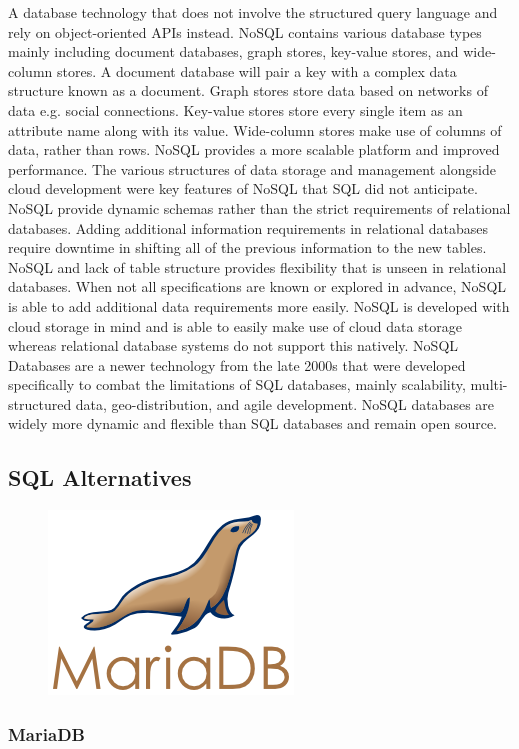 \documentclass[12pt]{report}
\begin{document}
\begin{enumerate}
A database technology that does not involve the structured query language and rely on object-oriented APIs instead.  NoSQL contains various database types mainly including document databases, graph stores, key-value stores, and wide-column stores.  A document database will pair a key with a complex data structure known as a document.  Graph stores store data based on networks of data e.g. social connections.  Key-value stores store every single item as an attribute name along with its value.  Wide-column stores make use of columns of data, rather than rows.  NoSQL provides a more scalable platform and improved performance.  The various structures of data storage and management alongside cloud development were key features of NoSQL that SQL did not anticipate.
NoSQL provide dynamic schemas rather than the strict requirements of relational databases.  Adding additional information requirements in relational databases require downtime in shifting all of the previous information to the new tables.  NoSQL and lack of table structure provides flexibility that is unseen in relational databases.  When not all specifications are known or explored in advance, NoSQL is able to add additional data requirements more easily.  NoSQL is developed with cloud storage in mind and is able to easily make use of cloud data storage whereas relational database systems do not support this natively.
NoSQL Databases are a newer technology from the late 2000s that were developed specifically to combat the limitations of SQL databases, mainly scalability, multi-structured data, geo-distribution, and agile development.  NoSQL databases are widely more dynamic and flexible than SQL databases and remain open source.

\subsection*{SQL Alternatives}

\begin{figure}[h]
	\centering
	\includegraphics[width=0.251\linewidth]{mariadb}
\end{figure}

\subsubsection*{MariaDB}


\end{enumerate}
\end{document}
